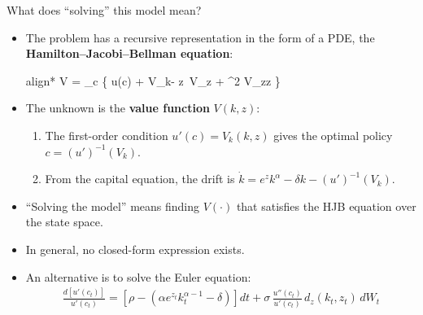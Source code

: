\documentclass[aspectratio=169,10pt]{beamer}
\newcommand{\emphcolor}[1]{\textbf{\textcolor{emphcolorval}{#1}}}
\begin{document}
\begin{frame}{What does ``solving'' this model mean?}
	\begin{itemize}
		\item The problem has a recursive representation in the form of a PDE, the \emphcolor{Hamilton--Jacobi--Bellman equation}:
		\begin{empheq}[box=\tcbhighmath]{align*}
			\rho V = \max_c \left\{ u(c) + V_k\! - \mu z\, V_z + \sigma^2 V_{zz} \right\}
		\end{empheq}
		\item The unknown is the \emphcolor{value function} $V(k,z)$:
		\begin{enumerate}
			\item The first-order condition $u'(c) = V_k(k,z)$ gives the optimal policy $c = (u')^{-1}(V_k)$.
			\item From the capital equation, the drift is $\dot{k} = e^z k^\alpha - \delta k - (u')^{-1}(V_k)$.
		\end{enumerate}
		\item ``Solving the model'' means finding $V(\cdot)$ that satisfies the HJB equation over the state space.
		\item In general, no closed-form expression exists.
		\item An alternative is to solve the Euler equation:
		\begin{align*}
			\frac{d\left[u'(c_t)\right]}{u'(c_t)} = \left[\rho - \left(\alpha e^{z_t} k_t^{\alpha-1} - \delta\right)\right] dt + \sigma\, \frac{u''(c_t)}{u'(c_t)}\, d_z(k_t,z_t)\, dW_t
		\end{align*}
	\end{itemize}
\end{frame}
\end{document}
